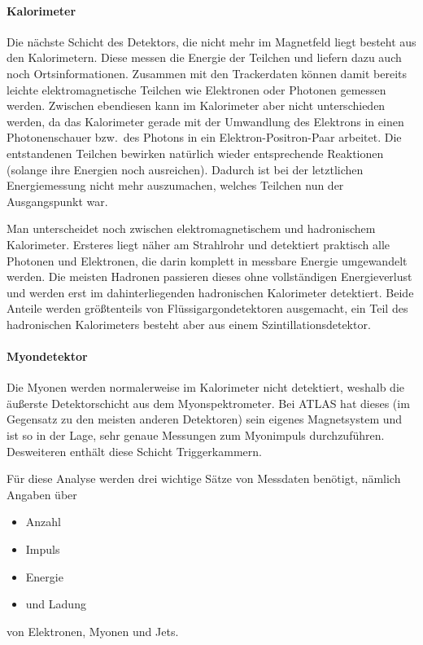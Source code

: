 \paragraph{Kalorimeter}
Die nächste Schicht des Detektors, die nicht mehr im Magnetfeld liegt besteht
aus den Kalorimetern. Diese messen die Energie der Teilchen und liefern dazu
auch noch Ortsinformationen. Zusammen mit den Trackerdaten können damit bereits
leichte elektromagnetische Teilchen wie Elektronen oder Photonen gemessen
werden. Zwischen ebendiesen kann im Kalorimeter aber nicht unterschieden
werden, da das Kalorimeter gerade mit der Umwandlung des Elektrons in einen
Photonenschauer bzw.\ des Photons in ein Elektron-Positron-Paar arbeitet. Die
entstandenen Teilchen bewirken natürlich wieder entsprechende Reaktionen
(solange ihre Energien noch ausreichen). Dadurch ist bei der letztlichen
Energiemessung nicht mehr auszumachen, welches Teilchen nun der Ausgangspunkt
war.

Man unterscheidet noch zwischen elektromagnetischem und hadronischem
Kalorimeter. Ersteres liegt näher am Strahlrohr und detektiert praktisch alle
Photonen und Elektronen, die darin komplett in messbare Energie umgewandelt
werden. Die meisten Hadronen passieren dieses ohne vollständigen Energieverlust
und werden erst im dahinterliegenden hadronischen Kalorimeter detektiert. Beide
Anteile werden größtenteils von Flüssigargondetektoren ausgemacht, ein Teil des
hadronischen Kalorimeters besteht aber aus einem Szintillationsdetektor.

\paragraph{Myondetektor}
Die Myonen werden normalerweise im Kalorimeter nicht detektiert, weshalb die
äußerste Detektorschicht aus dem Myonspektrometer. Bei ATLAS hat dieses (im
Gegensatz zu den meisten anderen Detektoren) sein eigenes Magnetsystem und ist
so in der Lage, sehr genaue Messungen zum Myonimpuls durchzuführen. Desweiteren
enthält diese Schicht Triggerkammern.

Für diese Analyse werden drei wichtige Sätze von Messdaten benötigt, nämlich
Angaben über 
\begin{itemize}
  \item Anzahl
  \item Impuls
  \item Energie
  \item und Ladung
\end{itemize} von Elektronen, Myonen und Jets.

